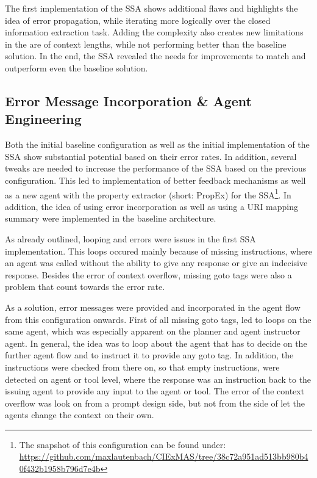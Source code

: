\documentclass[a4paper,oneside,bibliography=totoc]{scrbook}
\begin{document}
The first implementation of the \ac{SSA} shows additional flaws and highlights the idea of error propagation, while iterating more logically over the closed information extraction task. Adding the complexity also creates new limitations in the are of context lengths, while not performing better than the baseline solution. In the end, the \ac{SSA} revealed the needs for improvements to match and outperform even the baseline solution.

\subsection{Error Message Incorporation & Agent Engineering}
\label{subsec:error_message_incorporation}

Both the initial baseline configuration as well as the initial implementation of the \ac{SSA} show substantial potential based on their error rates. In addition, several tweaks are needed to increase the performance of the \ac{SSA} based on the previous configuration. This led to implementation of better feedback mechanisms as well as a new agent with the property extractor (short: PropEx) for the \ac{SSA}\footnote{The snapshot of this configuration can be found under: \url{https://github.com/maxlautenbach/CIExMAS/tree/38c72a951ad513bb980b40f432b1958b796d7e4b}}. In addition, the idea of using error incorporation as well as using a URI mapping summary were implemented in the baseline architecture.

As already outlined, looping and errors were issues in the first \ac{SSA} implementation. This loops occured mainly because of missing instructions, where an agent was called without the ability to give any response or give an indecisive response. Besides the error of context overflow, missing goto tags were also a problem that count towards the error rate.

As a solution, error messages were provided and incorporated in the agent flow from this configuration onwards. First of all missing goto tags, led to loops on the same agent, which was especially apparent on the planner and agent instructor agent. In general, the idea was to loop about the agent that has to decide on the further agent flow and to instruct it to provide any goto tag. In addition, the instructions were checked from there on, so that empty instructions, were detected on agent or tool level, where the response was an instruction back to the issuing agent to provide any input to the agent or tool. The error of the context overflow was look on from a prompt design side, but not from the side of let the agents change the context on their own.
\end{document}
